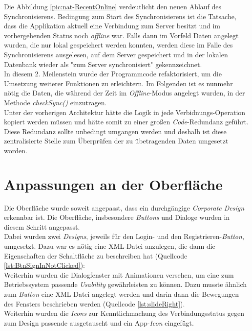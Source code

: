 Die Abbildung \ref{pic:nat-RecentOnline} verdeutlicht den neuen Ablauf des Synchronisierens. Bedingung zum Start des Synchronisierens ist die Tatsache, dass die Applikation aktuell eine Verbindung zum Server besitzt und im vorhergehenden Status noch \textit{offline} war. Falls dann im Vorfeld Daten angelegt wurden, die nur lokal gespeichert werden konnten, werden diese im Falle des Synchronisierens ausgelesen, auf dem Server gespeichert und in der lokalen Datenbank wieder als "zum Server synchronisiert" gekennzeichnet.\\
In diesem 2. Meilenstein wurde der Programmcode refaktorisiert, um die Umsetzung weiterer Funktionen zu erleichtern. Im Folgenden ist es nunmehr nötig die Daten, die während der Zeit im \textit{Offline}-Modus angelegt wurden, in der Methode \textit{checkSync()} einzutragen.\\
Unter der vorherigen Architektur hätte die Logik in jede Verbidnungs-Operation kopiert werden müssen und hätte somit zu einer großen \textit{Code}-Redundanz geführt. Diese Redundanz sollte unbedingt umgangen werden und deshalb ist diese zentralisierte Stelle zum Überprüfen der zu übetragenden Daten umgesetzt worden.

\section{Anpassungen an der Oberfläche}
\label{sec:anpassungen-oberflaeche}
Die Oberfläche wurde soweit angepasst, dass ein durchgängige \textit{Corporate Design} erkennbar ist. Die Oberfläche, insbesondere \textit{Buttons} und Dialoge wurden in diesem Schritt angepasst.\\
Dabei wurden zwei \textit{Designs}, jeweils für den Login- und den Registrieren-\textit{Button}, umgesetzt. Dazu war es nötig eine \ac{XML}-Datei anzulegen, die dann die Eigenschaften der Schaltfläche zu beschreiben hat (Quellcode \ref{lst:BtnSignInNotClicked}):
\\
Weiterhin wurden die Dialogfenster mit Animationen versehen, um eine zum Betriebssystem passende \textit{Usability} gewährleisten zu können. Dazu musste ähnlich zum \textit{Button} eine \ac{XML}-Datei angelegt werden und darin dann die Bewegungen des Fensters beschrieben werden (Quellcode \ref{lst:slideRight}).
\\
Weiterhin wurden die \textit{Icons} zur Kenntlichmachung des Verbindungsstatus gegen zum Design passende ausgetauscht und ein App-\textit{Icon} eingefügt.


